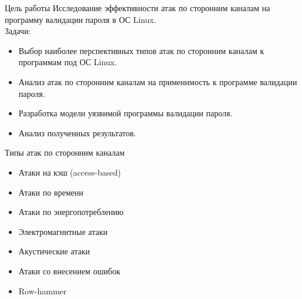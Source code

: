 \documentclass[14pt]{beamer}
\title[Атаки по сторонним каналам]{}
\author[]{Олейников Иван}
\institute[]{Университет ИТМО}
\date[]{Санкт-Петербург, 2017}
\begin{document}
\begin{darkbars}
    \begin{frame}
        \titlepage
    \end{frame}
\end{darkbars}

\begin{frame}{Цель работы}
    Исследование эффективности атак по сторонним каналам на программу валидации
    пароля в ОС Linux. \\[3mm]
    Задачи:
    \begin{itemize}
        \item Выбор наиболее перспективных типов атак по сторонним каналам к
              программам под ОС Linux.
        \item Анализ атак по сторонним каналам на применимость к программе валидации
              пароля.
        \item Разработка модели уязвимой программы валидации пароля.
        \item Анализ полученных результатов.
    \end{itemize}
\end{frame}

\begin{frame}[nologo]{Типы атак по сторонним каналам}
    \begin{itemize}
        \item Атаки на кэш (access-based)
        \item Атаки по времени
        \item Атаки по энергопотреблению
        \item Электромагнитные атаки
        \item Акустические атаки
        \item Атаки со внесением ошибок
        \item Row-hammer
    \end{itemize}
\end{frame}
\end{document}
